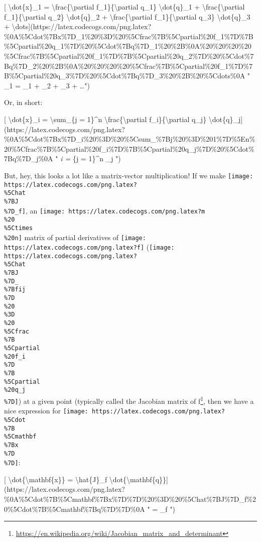\documentclass[]{article}
\renewcommand{\href}[2]{#2\footnote{\url{#1}}}
\begin{document}
{[} \textbackslash{}dot\{x\}\_1 = \textbackslash{}frac\{\textbackslash{}partial
f\_1\}\{\textbackslash{}partial q\_1\} \textbackslash{}dot\{q\}\_1 +
\textbackslash{}frac\{\textbackslash{}partial f\_1\}\{\textbackslash{}partial
q\_2\} \textbackslash{}dot\{q\}\_2 +
\textbackslash{}frac\{\textbackslash{}partial f\_1\}\{\textbackslash{}partial
q\_3\} \textbackslash{}dot\{q\}\_3 +
\textbackslash{}dots{]}(https://latex.codecogs.com/png.latex?\%0A\%5Cdot\%7Bx\%7D\_1\%20\%3D\%20\%5Cfrac\%7B\%5Cpartial\%20f\_1\%7D\%7B\%5Cpartial\%20q\_1\%7D\%20\%5Cdot\%7Bq\%7D\_1\%20\%2B\%0A\%20\%20\%20\%20\%5Cfrac\%7B\%5Cpartial\%20f\_1\%7D\%7B\%5Cpartial\%20q\_2\%7D\%20\%5Cdot\%7Bq\%7D\_2\%20\%2B\%0A\%20\%20\%20\%20\%5Cfrac\%7B\%5Cpartial\%20f\_1\%7D\%7B\%5Cpartial\%20q\_3\%7D\%20\%5Cdot\%7Bq\%7D\_3\%20\%2B\%20\%5Cdots\%0A
" \_1 =  \_1 +
 \_2 + 
\_3 + \dots ")

Or, in short:

{[} \textbackslash{}dot\{x\}\_i = \textbackslash{}sum\_\{j = 1\}\^{}n
\textbackslash{}frac\{\textbackslash{}partial f\_i\}\{\textbackslash{}partial
q\_j\}
\textbackslash{}dot\{q\}\_j{]}(https://latex.codecogs.com/png.latex?\%0A\%5Cdot\%7Bx\%7D\_i\%20\%3D\%20\%5Csum\_\%7Bj\%20\%3D\%201\%7D\%5En\%20\%5Cfrac\%7B\%5Cpartial\%20f\_i\%7D\%7B\%5Cpartial\%20q\_j\%7D\%20\%5Cdot\%7Bq\%7D\_j\%0A
" \emph{i = \sum}\{j = 1\}\^{}n 
\_j ")

But, hey, this looks a lot like a matrix-vector multiplication! If we make
\texttt{[image: https://latex.codecogs.com/png.latex?\\\%5Chat\\\%7BJ\\\%7D\_f]}, an
\texttt{[image: https://latex.codecogs.com/png.latex?m\\\%20\\\%5Ctimes\\\%20n]}
matrix of partial derivatives of
\texttt{[image: https://latex.codecogs.com/png.latex?f]}
(\texttt{[image: https://latex.codecogs.com/png.latex?\\\%5Chat\\\%7BJ\\\%7D\_\\\%7Bfij\\\%7D\\\%20\\\%3D\\\%20\\\%5Cfrac\\\%7B\\\%5Cpartial\\\%20f\_i\\\%7D\\\%7B\\\%5Cpartial\\\%20q\_j\\\%7D]})
at a given point (typically called the
\href{https://en.wikipedia.org/wiki/Jacobian_matrix_and_determinant}{Jacobian
matrix of f}, then we have a nice expression for
\texttt{[image: https://latex.codecogs.com/png.latex?\\\%5Cdot\\\%7B\\\%5Cmathbf\\\%7Bx\\\%7D\\\%7D]}:

{[} \textbackslash{}dot\{\textbackslash{}mathbf\{x\}\} =
\textbackslash{}hat\{J\}\_f
\textbackslash{}dot\{\textbackslash{}mathbf\{q\}\}{]}(https://latex.codecogs.com/png.latex?\%0A\%5Cdot\%7B\%5Cmathbf\%7Bx\%7D\%7D\%20\%3D\%20\%5Chat\%7BJ\%7D\_f\%20\%5Cdot\%7B\%5Cmathbf\%7Bq\%7D\%7D\%0A
"  = \_f  ")
\end{document}
